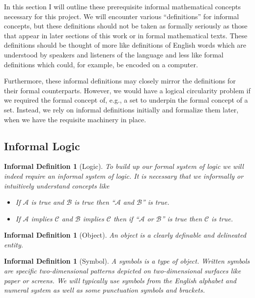 \documentclass[12pt]{article}
\theoremstyle{break}
\theoremstyle{break}
\theoremstyle{break}
\theoremstyle{break}
\theoremstyle{break}
\newtheorem{informal definition}[definition]{Informal Definition}
\theoremstyle{break}
\newtheorem{informal theorem}[theorem]{Informal Theorem}
\newcommand{\mc}[1]{\mathcal{#1}}
\newcommand{\qq}[1]{``#1''}
\begin{document}
	In this section I will outline these prerequisite informal mathematical concepts necessary for this project.
	We will encounter various \qq{definitions} for informal concepts, but these definitions should not be taken as formally seriously as those that appear in later sections of this work or in formal mathematical texts.
	These definitions should be thought of more like definitions of English words which are understood by speakers and listeners of the language and less like formal definitions which could, for example, be encoded on a computer.
	
	Furthermore, these informal definitions may closely mirror the definitions for their formal counterparts.
	However, we would have a logical circularity problem if we required the formal concept of, e.g., a set to underpin the formal concept of a set.
	Instead, we rely on informal definitions initially and formalize them later, when we have the requisite machinery in place.
	
	
	\subsection{Informal Logic}
	
	\begin{informal definition}[Logic]
		To build up our formal system of logic we will indeed require an informal system of logic.
		It is necessary that we informally or intuitively understand concepts like
		\begin{itemize}
			\item{If $\mc{A}$ is true and $\mc{B}$ is true then \qq{$\mc{A}$ and $\mc{B}$} is true.}
			\item{If $\mc{A}$ implies $\mc{C}$ and $\mc{B}$ implies $\mc{C}$ then if \qq{$\mc{A}$ or $\mc{B}$} is true then $\mc{C}$ is true.}
		\end{itemize}
	\end{informal definition}
	
	\begin{informal definition}[Object]
		An object is a clearly definable and delineated entity.
	\end{informal definition}
	
	\begin{informal definition}[Symbol]
		A symbols is a type of object.
		Written symbols are specific two-dimensional patterns depicted on two-dimensional surfaces like paper or screens.
		We will typically use symbols from the English alphabet and numeral system as well as some punctuation symbols and brackets.
	\end{informal definition}
	
\end{document}
